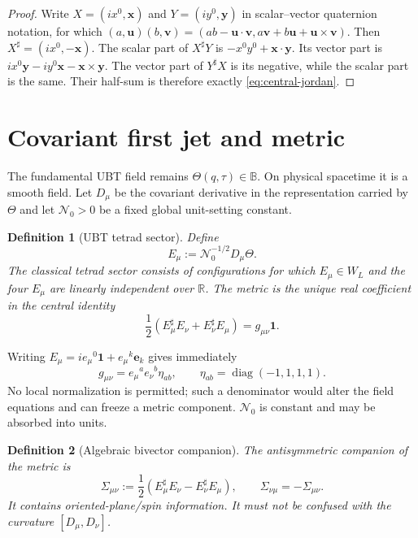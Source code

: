 \documentclass[12pt]{article}
\newtheorem{definition}{Definition}[section]
\theoremstyle{remark}\newtheorem{remark}[definition]{Remark}
\begin{document}
\begin{proof}
Write $X=(ix^0,\mathbf x)$ and $Y=(iy^0,\mathbf y)$ in scalar--vector
quaternion notation, for which
$(a,\mathbf u)(b,\mathbf v)=(ab-\mathbf u\cdot\mathbf v,
 a\mathbf v+b\mathbf u+\mathbf u\times\mathbf v)$.
Then $X^\sharp=(ix^0,-\mathbf x)$.  The scalar part of $X^\sharp Y$ is
$-x^0y^0+\mathbf x\cdot\mathbf y$.  Its vector part is
$i x^0\mathbf y-i y^0\mathbf x-\mathbf x\times\mathbf y$.
The vector part of $Y^\sharp X$ is its negative, while the scalar part is the
same.  Their half-sum is therefore exactly \eqref{eq:central-jordan}.
\end{proof}

\section{Covariant first jet and metric}
The fundamental UBT field remains $\Theta(q,\tau)\in\mathbb B$.  On physical
spacetime it is a smooth field.  Let $D_\mu$ be the covariant derivative in the
representation carried by $\Theta$ and let $\mathcal N_0>0$ be a fixed global
unit-setting constant.

\begin{definition}[UBT tetrad sector]
Define
\begin{equation}
 E_\mu:=\mathcal N_0^{-1/2}D_\mu\Theta.
 \label{eq:E-def}
\end{equation}
The classical tetrad sector consists of configurations for which
$E_\mu\in W_L$ and the four $E_\mu$ are linearly independent over $\mathbb R$.
The metric is the unique real coefficient in the central identity
\begin{equation}
 \boxed{\frac12\left(E_\mu^\sharp E_\nu+E_\nu^\sharp E_\mu\right)
       =g_{\mu\nu}\mathbf1.}
 \label{eq:metric-central}
\end{equation}
\end{definition}

Writing $E_\mu=i e_\mu{}^0\mathbf1+e_\mu{}^k\mathbf e_k$ gives immediately
\begin{equation}
 g_{\mu\nu}=e_\mu{}^a e_\nu{}^b\eta_{ab},
 \qquad \eta_{ab}=\operatorname{diag}(-1,1,1,1).
 \label{eq:tetrad-metric}
\end{equation}
No local normalization is permitted; such a denominator would alter the
field equations and can freeze a metric component.  $\mathcal N_0$ is constant
and may be absorbed into units.

\begin{definition}[Algebraic bivector companion]
The antisymmetric companion of the metric is
\begin{equation}
 \Sigma_{\mu\nu}:=\frac12\left(E_\mu^\sharp E_\nu-E_\nu^\sharp E_\mu\right),
 \qquad \Sigma_{\nu\mu}=-\Sigma_{\mu\nu}.
 \label{eq:bivector}
\end{equation}
It contains oriented-plane/spin information.  It must not be confused with
the curvature $[D_\mu,D_\nu]$.
\end{definition}
\end{document}
